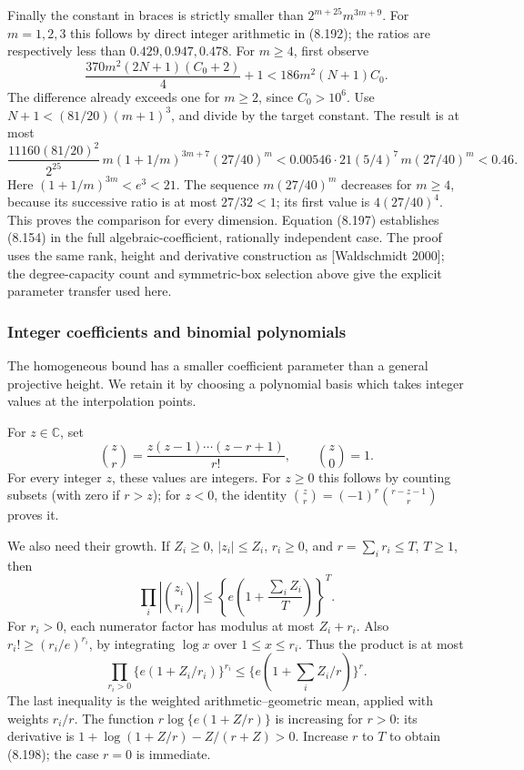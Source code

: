 \documentclass[
  11pt,
  a4paper,
]{article}
\begin{document}
Finally the constant in braces is strictly smaller than
\(2^{m+25}m^{3m+9}\). For \(m=1,2,3\) this follows by direct integer
arithmetic in (8.192); the ratios are respectively less than
\(0.429,0.947,0.478\). For \(m\ge4\), first observe \[
\frac{370m^2(2N+1)(C_0+2)}4+1
<186m^2(N+1)C_0.
\] The difference already exceeds one for \(m\ge2\), since \(C_0>10^6\).
Use \(N+1<(81/20)(m+1)^3\), and divide by the target constant. The
result is at most \[
\frac{11160(81/20)^2}{2^{25}}\,
m(1+1/m)^{3m+7}(27/40)^m
<
0.00546\cdot21(5/4)^7\,m(27/40)^m<0.46.
\] Here \((1+1/m)^{3m}<e^3<21\). The sequence \(m(27/40)^m\) decreases
for \(m\ge4\), because its successive ratio is at most \(27/32<1\); its
first value is \(4(27/40)^4\). This proves the comparison for every
dimension. Equation (8.197) establishes (8.154) in the full
algebraic-coefficient, rationally independent case. The proof uses the
same rank, height and derivative construction as {[}Waldschmidt 2000{]};
the degree-capacity count and symmetric-box selection above give the
explicit parameter transfer used here.

\subsubsection{Integer coefficients and binomial
polynomials}\label{integer-coefficients-and-binomial-polynomials}

The homogeneous bound has a smaller coefficient parameter than a general
projective height. We retain it by choosing a polynomial basis which
takes integer values at the interpolation points.

For \(z\in\mathbb C\), set \[
\binom zr=\frac{z(z-1)\cdots(z-r+1)}{r!},\qquad \binom z0=1.
\] For every integer \(z\), these values are integers. For \(z\ge0\)
this follows by counting subsets (with zero if \(r>z\)); for \(z<0\),
the identity \(\binom zr=(-1)^r\binom{r-z-1}{r}\) proves it.

We also need their growth. If \(Z_i\ge0\), \(|z_i|\le Z_i\),
\(r_i\ge0\), and \(r=\sum_ir_i\le T\), \(T\ge1\), then \[
\prod_i\left|\binom{z_i}{r_i}\right|
\le\left\{e\left(1+\frac{\sum_iZ_i}{T}\right)\right\}^{T}.
\tag{8.198}
\] For \(r_i>0\), each numerator factor has modulus at most \(Z_i+r_i\).
Also \(r_i!\ge(r_i/e)^{r_i}\), by integrating \(\log x\) over
\(1\le x\le r_i\). Thus the product is at most \[
\prod_{r_i>0}\{e(1+Z_i/r_i)\}^{r_i}
\le\{e(1+\sum_iZ_i/r)\}^{r}.
\] The last inequality is the weighted arithmetic--geometric mean,
applied with weights \(r_i/r\). The function \(r\log\{e(1+Z/r)\}\) is
increasing for \(r>0\): its derivative is \(1+\log(1+Z/r)-Z/(r+Z)>0\).
Increase \(r\) to \(T\) to obtain (8.198); the case \(r=0\) is
immediate.
\end{document}
